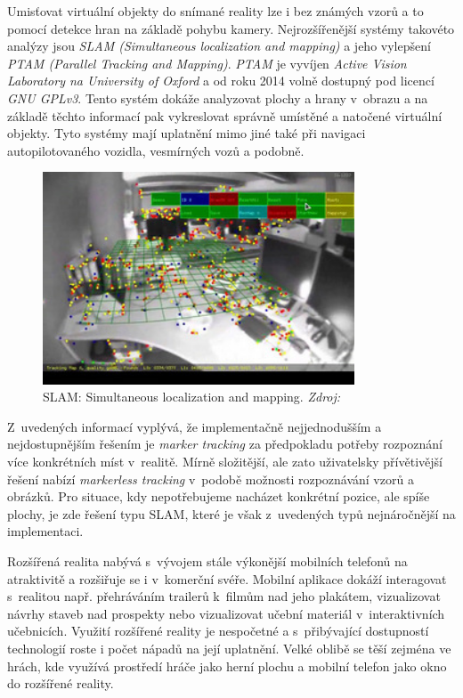 \documentclass[twoside,12pt]{article}
\begin{document}
Umisťovat virtuální objekty do snímané reality lze i bez známých vzorů a to pomocí detekce hran na základě pohybu kamery. Nejrozšířenější systémy takovéto analýzy jsou \textit{SLAM (Simultaneous localization and mapping)} a jeho vylepšení \textit{PTAM (Parallel Tracking and Mapping)}. \textit{PTAM} je vyvíjen \textit{Active Vision Laboratory na University of Oxford} a od roku 2014 volně dostupný pod licencí \textit{GNU GPLv3}. Tento systém dokáže analyzovat plochy a hrany v~obrazu a na základě těchto informací pak vykreslovat správně umístěné a natočené virtuální objekty. Tyto systémy mají uplatnění mimo jiné také při navigaci autopilotovaného vozidla, vesmírných vozů a podobně.

\begin{figure}[H]
    \includegraphics[width=350px, center]{images/slam.jpg}
    
    \caption[]{SLAM: Simultaneous localization and mapping. \textit{Zdroj: \cite{slam}}}
    \label{slam}
\end{figure}

Z~uvedených informací vyplývá, že implementačně nejjednodušším a nejdostupnějším řešením je \textit{marker tracking} za předpokladu potřeby rozpoznání více konkrétních míst v~realitě. Mírně složitější, ale zato uživatelsky přívětivější řešení nabízí \textit{markerless tracking} v~podobě možnosti rozpoznávání vzorů a obrázků. Pro situace, kdy nepotřebujeme nacházet konkrétní pozice, ale spíše plochy, je zde řešení typu SLAM, které je však z~uvedených typů nejnáročnější na implementaci.

%
%

Rozšířená realita nabývá s~vývojem stále výkonější mobilních telefonů na atraktivitě a rozšiřuje se i v~komerční svéře. Mobilní aplikace dokáží interagovat s~realitou např. přehráváním trailerů k~filmům nad jeho plakátem, vizualizovat návrhy staveb nad prospekty nebo vizualizovat učební materiál v~interaktivních učebnicích. Využití rozšířené reality je nespočetné a s~přibývající dostupností technologií roste i počet nápadů na její uplatnění. Velké oblibě se těší zejména ve hrách, kde využívá prostředí hráče jako herní plochu a mobilní telefon jako okno do rozšířené reality.
\end{document}
